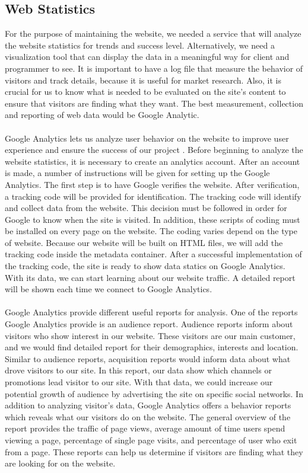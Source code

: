 \documentclass[letterpaper,10pt, draftclsnofoot,onecolumn]{IEEEtran}
\begin{document}
{{\subsection[Web Statistics]{\noindent\color{black}
Web Statistics}
{\noindent\color{black}
For the purpose of maintaining the website, we needed a service that will analyze the website statistics for trends and success level.
Alternatively, we need a visualization tool that can display the data in a meaningful way for client and programmer to see.
It is important to have a log file that measure the behavior of visitors and track details, because it is useful for market research. 
Also, it is crucial for us to know what is needed to be evaluated on the site’s content to ensure that visitors are finding what they want.
The best measurement, collection and reporting of web data would be Google Analytic. 
\\	\\
\noindent Google Analytics lets us analyze user behavior on the website to improve user experience and ensure the success of our project \cite{website1}. 
Before beginning to analyze the website statistics, it is necessary to create an analytics account. 
After an account is made, a number of instructions will be given for setting up the Google Analytics.
The first step is to have Google verifies the website.
After verification, a tracking code will be provided for identification. 
The tracking code will identify and collect data from the website. 
This decision must be followed in order for Google to know when the site is visited. 
In addition, these scripts of coding must be installed on every page on the website.
The coding varies depend on the type of website. Because our website will be built on HTML files, we will add the tracking code inside the metadata container. 
After a successful implementation of the tracking code, the site is ready to show data statics on Google Analytics.
With its data, we can start learning about our website traffic. 
A detailed report will be shown each time we connect to Google Analytics.
\\	\\
\noindent Google Analytics provide different useful reports for analysis.
One of the reports Google Analytics provide is an audience report. 
Audience reports inform about visitors who show interest in our website. 
These visitors are our main customer, and we would find detailed report for their demographics, interests and location. 
Similar to audience reports, acquisition reports would inform data about what drove visitors to our site.
In this report, our data show which channels or promotions lead visitor to our site.
With that data, we could increase our potential growth of audience by advertising the site on specific social networks. 
In addition to analyzing visitor's data, Google Analytics offers a behavior reports which reveals what our visitors do on the website.
The general overview of the report provides the traffic of page views, average amount of time users spend viewing a page, percentage of single page visits, and percentage of user who exit from a page. 
These reports can help us determine if visitors are finding what they are looking for on the website.  
}

}}
\end{document}
